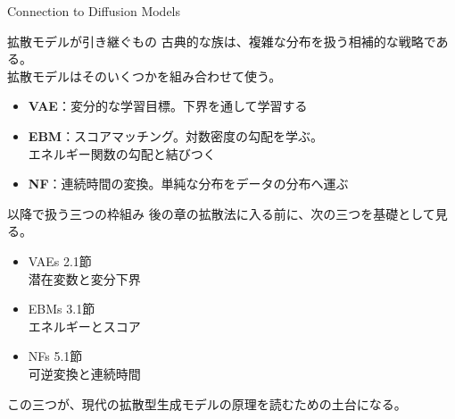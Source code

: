 \begin{frame}{Connection to Diffusion Models}
    \begin{block}{拡散モデルが引き継ぐもの}
        古典的な族は、複雑な分布を扱う相補的な戦略である。\\
        拡散モデルはそのいくつかを組み合わせて使う。
    \end{block}
    \vspace{0.6em}
    \begin{itemize}
        \item \textbf{VAE}：変分的な学習目標。下界を通して学習する
        \item \textbf{EBM}：スコアマッチング。対数密度の勾配を学ぶ。\\
        エネルギー関数の勾配と結びつく
        \item \textbf{NF}：連続時間の変換。単純な分布をデータの分布へ運ぶ
    \end{itemize}
\end{frame}
\begin{frame}{以降で扱う三つの枠組み}
    後の章の拡散法に入る前に、次の三つを基礎として見る。
    \vspace{0.8em}
    \begin{itemize}
        \item VAEs \quad 2.1節\\
        潜在変数と変分下界
        \item EBMs \quad 3.1節\\
        エネルギーとスコア
        \item NFs \quad 5.1節\\
        可逆変換と連続時間
    \end{itemize}
    \vspace{0.6em}
    \begin{exampleblock}{}
        この三つが、現代の拡散型生成モデルの原理を読むための土台になる。
    \end{exampleblock}
\end{frame}
